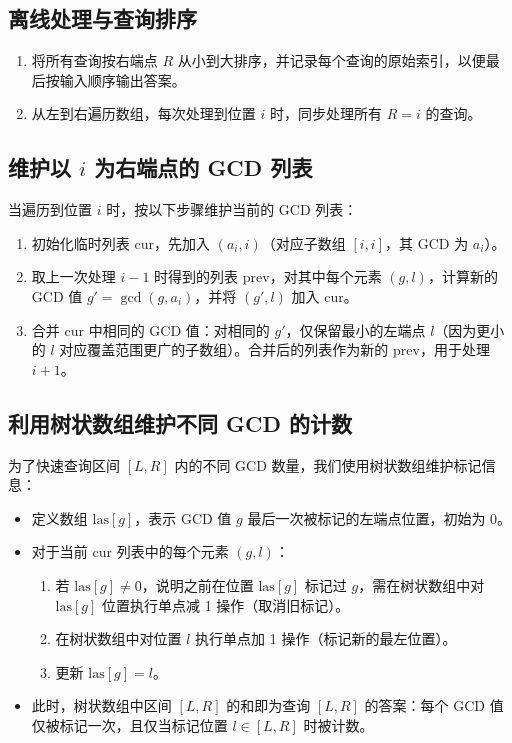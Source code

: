 \documentclass[11pt,a4paper,twocolumn]{ctexart}  %
\begin{document}
\subsection*{离线处理与查询排序}
\begin{enumerate}
    \item 将所有查询按右端点 $R$ 从小到大排序，并记录每个查询的原始索引，以便最后按输入顺序输出答案。
    \item 从左到右遍历数组，每次处理到位置 $i$ 时，同步处理所有 $R = i$ 的查询。
\end{enumerate}

\subsection*{维护以 $i$ 为右端点的 GCD 列表}
当遍历到位置 $i$ 时，按以下步骤维护当前的 GCD 列表：
\begin{enumerate}
    \item 初始化临时列表 $\mathrm{cur}$，先加入 $(a_i, i)$（对应子数组 $[i, i]$，其 GCD 为 $a_i$）。
    \item 取上一次处理 $i-1$ 时得到的列表 $\mathrm{prev}$，对其中每个元素 $(g, l)$，计算新的 GCD 值 $g' = \gcd(g, a_i)$，并将 $(g', l)$ 加入 $\mathrm{cur}$。
    \item 合并 $\mathrm{cur}$ 中相同的 GCD 值：对相同的 $g'$，仅保留最小的左端点 $l$（因为更小的 $l$ 对应覆盖范围更广的子数组）。合并后的列表作为新的 $\mathrm{prev}$，用于处理 $i+1$。
\end{enumerate}

\subsection*{利用树状数组维护不同 GCD 的计数}
为了快速查询区间 $[L, R]$ 内的不同 GCD 数量，我们使用树状数组维护标记信息：
\begin{itemize}
    \item 定义数组 $\mathrm{las}[g]$，表示 GCD 值 $g$ 最后一次被标记的左端点位置，初始为 0。
    \item 对于当前 $\mathrm{cur}$ 列表中的每个元素 $(g, l)$：
    \begin{enumerate}
        \item 若 $\mathrm{las}[g] \neq 0$，说明之前在位置 $\mathrm{las}[g]$ 标记过 $g$，需在树状数组中对 $\mathrm{las}[g]$ 位置执行单点减 1 操作（取消旧标记）。
        \item 在树状数组中对位置 $l$ 执行单点加 1 操作（标记新的最左位置）。
        \item 更新 $\mathrm{las}[g] = l$。
    \end{enumerate}
    \item 此时，树状数组中区间 $[L, R]$ 的和即为查询 $[L, R]$ 的答案：每个 GCD 值仅被标记一次，且仅当标记位置 $l \in [L, R]$ 时被计数。
\end{itemize}
\end{document}
